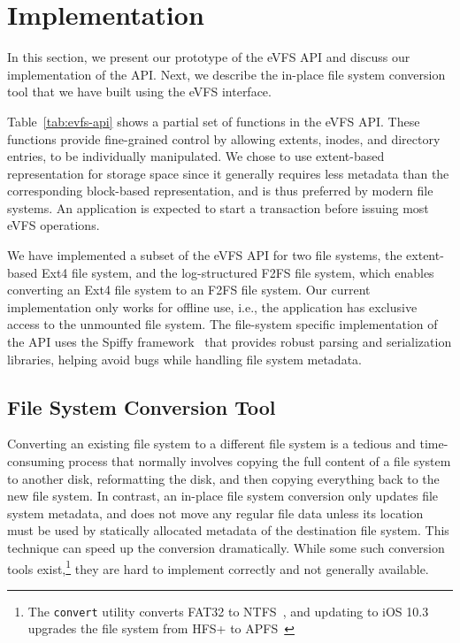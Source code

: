 \vspace{-0.5em}
\section{Implementation\label{sec:Implementation}}

In this section, we present our prototype of the eVFS API and discuss our implementation of the API. Next, we describe the in-place file system conversion tool that we have built using the eVFS interface.

Table~\ref{tab:evfs-api} shows a partial set of functions in the eVFS API. These functions provide fine-grained control by allowing extents, inodes, and directory entries, to be individually manipulated. We chose to use extent-based representation for storage space since it generally requires less metadata than the corresponding block-based representation, and is thus preferred by modern file systems. An application is expected to start a transaction before issuing most eVFS operations. 


We have implemented a subset of the eVFS API for two file systems, the extent-based Ext4 file system, and the log-structured F2FS file system, which enables converting an Ext4 file system to an F2FS file system. Our current implementation only works for offline use, i.e., the application has exclusive access to the unmounted file system. The file-system specific implementation of the API uses the Spiffy framework~\cite{sun2018spiffy} that provides robust parsing and serialization libraries, helping avoid bugs while handling file system metadata.

\vspace{-0.5em}
\subsection{File System Conversion Tool\label{subsec:conversion_tool}}

Converting an existing file system to a different file system is a tedious and time-consuming process that normally involves copying the full content of a file system to another disk, reformatting the disk, and then copying everything back to the new file system. In contrast, an in-place file system conversion only updates file system metadata, and does not move any regular file data unless its location must be used by statically allocated metadata of the destination file system. This technique can speed up the conversion dramatically. While some such conversion tools exist,\footnote{The \texttt{convert} utility converts FAT32 to NTFS~\cite{fat-to-ntfs}, and updating to iOS 10.3 upgrades the file system from HFS+ to APFS~\cite{apfs-upgrade}} they are hard to implement correctly and not generally available.

